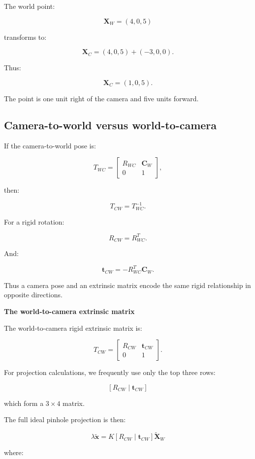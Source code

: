 The world point:

\[
 \mathbf X_W=(4,0,5)
\]

transforms to:

\[
 \mathbf X_C= (4,0,5)+(-3,0,0).
\]

Thus:

\[
 \boxed{ \mathbf X_C=(1,0,5) }.
\]

The point is one unit right of the camera and five units forward.

\subsection{Camera-to-world versus world-to-camera}\label{02-foundations-ii-ch035-camera-to-world-versus-world-to-camera}

If the camera-to-world pose is:

\[
 T_{WC}= \begin{bmatrix} R_{WC}&\mathbf C_W\\ 0&1 \end{bmatrix},
\]

then:

\[
 \boxed{ T_{CW}=T_{WC}^{-1} }.
\]

For a rigid rotation:

\[
 R_{CW}=R_{WC}^T.
\]

And:

\[
 \boxed{ \mathbf t_{CW}=-R_{WC}^T\mathbf C_W }.
\]

Thus a camera pose and an extrinsic matrix encode the same rigid relationship in opposite directions.

\textbf{The world-to-camera extrinsic matrix}

The world-to-camera rigid extrinsic matrix is:

\[
 \boxed{ T_{CW}= \begin{bmatrix} R_{CW}&\mathbf t_{CW}\\ 0&1 \end{bmatrix} }.
\]

For projection calculations, we frequently use only the top three rows:

\[
 \boxed{ [R_{CW}\mid\mathbf t_{CW}] }
\]

which form a \(3\times4\) matrix.

The full ideal pinhole projection is then:

\[
 \boxed{ \lambda\tilde{\mathbf x} = K[R_{CW}\mid\mathbf t_{CW}] \tilde{\mathbf X}_W }
\]

where:

